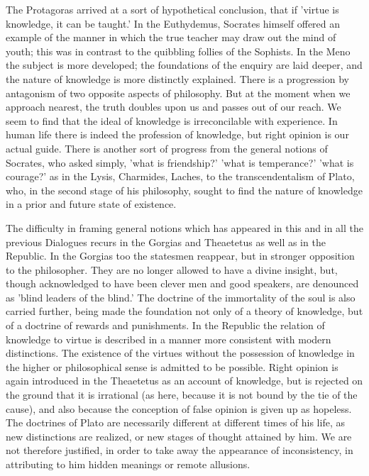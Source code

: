 \documentclass[11pt,letter]{article}
\begin{document}
\par  The Protagoras arrived at a sort of hypothetical conclusion, that if 'virtue is knowledge, it can be taught.' In the Euthydemus, Socrates himself offered an example of the manner in which the true teacher may draw out the mind of youth; this was in contrast to the quibbling follies of the Sophists. In the Meno the subject is more developed; the foundations of the enquiry are laid deeper, and the nature of knowledge is more distinctly explained. There is a progression by antagonism of two opposite aspects of philosophy. But at the moment when we approach nearest, the truth doubles upon us and passes out of our reach. We seem to find that the ideal of knowledge is irreconcilable with experience. In human life there is indeed the profession of knowledge, but right opinion is our actual guide. There is another sort of progress from the general notions of Socrates, who asked simply, 'what is friendship?' 'what is temperance?' 'what is courage?' as in the Lysis, Charmides, Laches, to the transcendentalism of Plato, who, in the second stage of his philosophy, sought to find the nature of knowledge in a prior and future state of existence.

\par  The difficulty in framing general notions which has appeared in this and in all the previous Dialogues recurs in the Gorgias and Theaetetus as well as in the Republic. In the Gorgias too the statesmen reappear, but in stronger opposition to the philosopher. They are no longer allowed to have a divine insight, but, though acknowledged to have been clever men and good speakers, are denounced as 'blind leaders of the blind.' The doctrine of the immortality of the soul is also carried further, being made the foundation not only of a theory of knowledge, but of a doctrine of rewards and punishments. In the Republic the relation of knowledge to virtue is described in a manner more consistent with modern distinctions. The existence of the virtues without the possession of knowledge in the higher or philosophical sense is admitted to be possible. Right opinion is again introduced in the Theaetetus as an account of knowledge, but is rejected on the ground that it is irrational (as here, because it is not bound by the tie of the cause), and also because the conception of false opinion is given up as hopeless. The doctrines of Plato are necessarily different at different times of his life, as new distinctions are realized, or new stages of thought attained by him. We are not therefore justified, in order to take away the appearance of inconsistency, in attributing to him hidden meanings or remote allusions.
\end{document}
